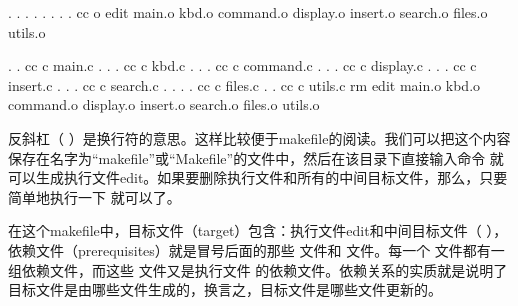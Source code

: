 \documentclass[a4paper,10pt]{sphinxmanual}
\begin{document}
\begin{sphinxVerbatim}[commandchars=\\\{\}]
 . . . . \PYGZbs{}
        . . . .
    cc \PYGZhy{}o edit main.o kbd.o command.o display.o 
        insert.o search.o files.o utils.o

 . .
    cc \PYGZhy{}c main.c
 . . .
    cc \PYGZhy{}c kbd.c
 . . .
    cc \PYGZhy{}c command.c
 . . .
    cc \PYGZhy{}c display.c
 . . .
    cc \PYGZhy{}c insert.c
 . . .
    cc \PYGZhy{}c search.c
 . . . .
    cc \PYGZhy{}c files.c
 . .
    cc \PYGZhy{}c utils.c
    rm edit main.o kbd.o command.o display.o 
        insert.o search.o files.o utils.o
\end{sphinxVerbatim}

反斜杠（ \sphinxcode{\sphinxupquote{\textbackslash{}}} ）是换行符的意思。这样比较便于makefile的阅读。我们可以把这个内容保存在名字为“makefile”或“Makefile”的文件中，然后在该目录下直接输入命令  就可以生成执行文件edit。如果要删除执行文件和所有的中间目标文件，那么，只要简单地执行一下  就可以了。

在这个makefile中，目标文件（target）包含：执行文件edit和中间目标文件（  ），依赖文件（prerequisites）就是冒号后面的那些  文件和  文件。每一个  文件都有一组依赖文件，而这些  文件又是执行文件  的依赖文件。依赖关系的实质就是说明了目标文件是由哪些文件生成的，换言之，目标文件是哪些文件更新的。
\end{document}
